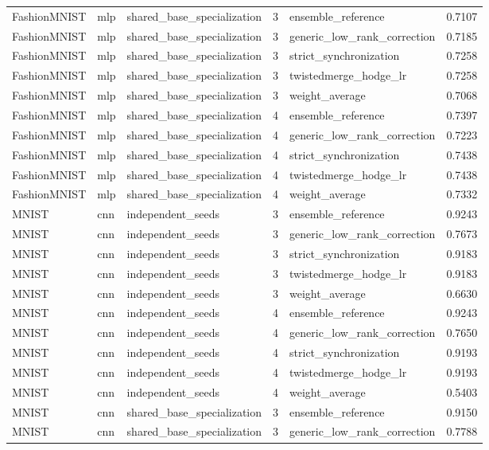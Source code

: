 \begin{table}[t]
\begin{tabular}{llllll}
FashionMNIST & mlp & shared\_base\_specialization & 3 & ensemble\_reference & 0.7107 \\
FashionMNIST & mlp & shared\_base\_specialization & 3 & generic\_low\_rank\_correction & 0.7185 \\
FashionMNIST & mlp & shared\_base\_specialization & 3 & strict\_synchronization & 0.7258 \\
FashionMNIST & mlp & shared\_base\_specialization & 3 & twistedmerge\_hodge\_lr & 0.7258 \\
FashionMNIST & mlp & shared\_base\_specialization & 3 & weight\_average & 0.7068 \\
FashionMNIST & mlp & shared\_base\_specialization & 4 & ensemble\_reference & 0.7397 \\
FashionMNIST & mlp & shared\_base\_specialization & 4 & generic\_low\_rank\_correction & 0.7223 \\
FashionMNIST & mlp & shared\_base\_specialization & 4 & strict\_synchronization & 0.7438 \\
FashionMNIST & mlp & shared\_base\_specialization & 4 & twistedmerge\_hodge\_lr & 0.7438 \\
FashionMNIST & mlp & shared\_base\_specialization & 4 & weight\_average & 0.7332 \\
MNIST & cnn & independent\_seeds & 3 & ensemble\_reference & 0.9243 \\
MNIST & cnn & independent\_seeds & 3 & generic\_low\_rank\_correction & 0.7673 \\
MNIST & cnn & independent\_seeds & 3 & strict\_synchronization & 0.9183 \\
MNIST & cnn & independent\_seeds & 3 & twistedmerge\_hodge\_lr & 0.9183 \\
MNIST & cnn & independent\_seeds & 3 & weight\_average & 0.6630 \\
MNIST & cnn & independent\_seeds & 4 & ensemble\_reference & 0.9243 \\
MNIST & cnn & independent\_seeds & 4 & generic\_low\_rank\_correction & 0.7650 \\
MNIST & cnn & independent\_seeds & 4 & strict\_synchronization & 0.9193 \\
MNIST & cnn & independent\_seeds & 4 & twistedmerge\_hodge\_lr & 0.9193 \\
MNIST & cnn & independent\_seeds & 4 & weight\_average & 0.5403 \\
MNIST & cnn & shared\_base\_specialization & 3 & ensemble\_reference & 0.9150 \\
MNIST & cnn & shared\_base\_specialization & 3 & generic\_low\_rank\_correction & 0.7788 \\

\end{tabular}
\end{table}

